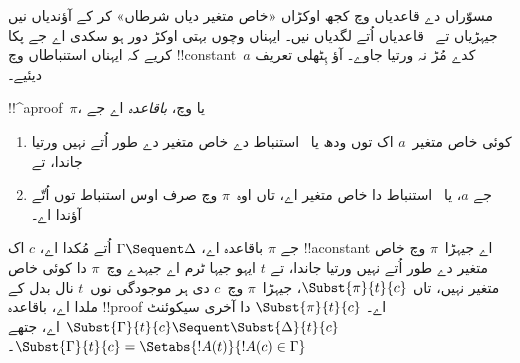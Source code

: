 \documentclass[../../../include/open-logic-section]{subfiles}
\begin{document}


مسوّراں دے قاعدیاں وچ کجھ اوکڑاں «خاص متغیر دیاں شرطاں» کر کے آؤندیاں نیں جیہڑیاں \LeftR{\lexists} تے~\RightR{\lforall} قاعدیاں اُتے لگدیاں نیں۔ ایہناں وچوں بہتی اوکڑ دور ہو سکدی اے جے پکا کریے کہ ایہناں استنباطاں وچ !!{constant}~$a$ کدے مُڑ نہ ورتیا جاوے۔ آؤ ہِٹھلی تعریف دیئیے۔

\begin{defn}
!!^a{proof}~$\pi$،  یا  وچ، \emph{باقاعدہ} اے جے
\begin{enumerate}
  \item کوئی خاص متغیر~$a$ اک توں ودھ \LeftR{\lexists} یا~\RightR{\lforall} استنباط دے خاص متغیر دے طور اُتے نہیں ورتیا جاندا، تے
  \item جے $a$، \LeftR{\lexists} یا~\RightR{\lforall} استنباط دا خاص متغیر اے، تاں اوہ~$\pi$ وچ صرف اوس استنباط توں اُتّے آؤندا اے۔
\end{enumerate}
\end{defn}

\begin{lem}
جے $\pi$ باقاعدہ اے، $ \Gamma \Sequent \Delta$ اُتے مُکدا اے، $c$ اک !!a{constant} اے جیہڑا~$\pi$ وچ خاص متغیر دے طور اُتے نہیں ورتیا جاندا، تے $t$ ایہو جیہا ٹرم اے جیہدے وچ~$\pi$ دا کوئی خاص متغیر نہیں، تاں $ \Subst{\pi}{t}{c}$، جیہڑا~$\pi$ وچ~$c$ دی ہر موجودگی نوں~$t$ نال بدل کے ملدا اے، باقاعدہ !!{proof} اے۔ $ \Subst{\pi}{t}{c}$ دا آخری سیکوئنٹ $ \Subst{\Gamma}{t}{c}
\Sequent \Subst{\Delta}{t}{c}$ اے، جتھے $ \Subst{\Gamma}{t}{c} =
\Setabs{!A(t)}{!A(c) \in \Gamma}$۔
\end{lem}
\end{document}

